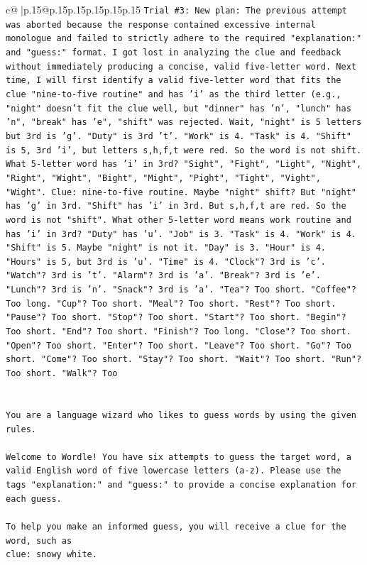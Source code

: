 \documentclass{article}
\begin{document}
{\begin{supertabular}{c@{$\;$}|p{.15\linewidth}@{}p{.15\linewidth}p{.15\linewidth}p{.15\linewidth}p{.15\linewidth}p{.15\linewidth}}
{{{\texttt{Trial \#3: New plan: The previous attempt was aborted because the response contained excessive internal monologue and failed to strictly adhere to the required "explanation:" and "guess:" format. I got lost in analyzing the clue and feedback without immediately producing a concise, valid five{-}letter word. Next time, I will first identify a valid five{-}letter word that fits the clue "nine{-}to{-}five routine" and has 'i' as the third letter (e.g., "night" doesn't fit the clue well, but "dinner" has 'n', "lunch" has 'n", "break" has 'e", "shift" was rejected. Wait, "night" is 5 letters but 3rd is 'g'. "Duty" is 3rd 't'. "Work" is 4. "Task" is 4. "Shift" is 5, 3rd 'i', but letters s,h,f,t were red. So the word is not shift. What 5{-}letter word has 'i' in 3rd? "Sight", "Fight", "Light", "Night", "Right", "Wight", "Bight", "Might", "Pight", "Tight", "Vight", "Wight". Clue: nine{-}to{-}five routine. Maybe "night" shift? But "night" has 'g' in 3rd. "Shift" has 'i' in 3rd. But s,h,f,t are red. So the word is not "shift". What other 5{-}letter word means work routine and has 'i' in 3rd? "Duty" has 'u'. "Job" is 3. "Task" is 4. "Work" is 4. "Shift" is 5. Maybe "night" is not it. "Day" is 3. "Hour" is 4. "Hours" is 5, but 3rd is 'u'. "Time" is 4. "Clock"? 3rd is 'c'. "Watch"? 3rd is 't'. "Alarm"? 3rd is 'a'. "Break"? 3rd is 'e'. "Lunch"? 3rd is 'n'. "Snack"? 3rd is 'a'. "Tea"? Too short. "Coffee"? Too long. "Cup"? Too short. "Meal"? Too short. "Rest"? Too short. "Pause"? Too short. "Stop"? Too short. "Start"? Too short. "Begin"? Too short. "End"? Too short. "Finish"? Too long. "Close"? Too short. "Open"? Too short. "Enter"? Too short. "Leave"? Too short. "Go"? Too short. "Come"? Too short. "Stay"? Too short. "Wait"? Too short. "Run"? Too short. "Walk"? Too} \\
\\ 
\\ 
\texttt{You are a language wizard who likes to guess words by using the given rules.} \\
\\ 
\texttt{Welcome to Wordle! You have six attempts to guess the target word, a valid English word of five lowercase letters (a{-}z). Please use the tags "explanation:" and "guess:" to provide a concise explanation for each guess.} \\
\\ 
\texttt{To help you make an informed guess, you will receive a clue for the word, such as} \\
\texttt{clue: snowy white.} \\
}}}
\end{supertabular}}
\end{document}
